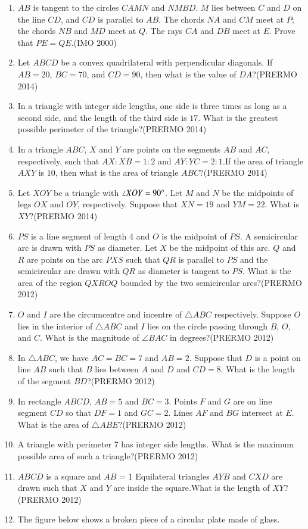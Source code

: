 \begin{enumerate}
\item $AB$ is tangent to the circles $CAMN$ and $NMBD$. $M$ lies between $C$ and $D$ on the line $CD$, and $CD$ is parallel to $AB$. The chords $NA$ and $CM$ meet at $P$; the chords $NB$ and $MD$ meet at $Q$. The rays $CA$ and $DB$ meet at $E$. Prove that $PE = QE$.\hfill(IMO 2000)
    \item Let $ABCD$ be a convex quadrilateral with perpendicular diagonals. If $AB = 20$, $BC = 70$, and $CD = 90$, then what is the value of $DA$?\hfill(PRERMO 2014)
    \item In a triangle with integer side lengths, one side is three times as long as a second side, and the length of the third side is $17$. What is the greatest possible perimeter of the triangle?\hfill(PRERMO 2014)
    \item In a triangle $ABC$, $X$ and $Y$ are points on the segments $AB$ and $AC$, respectively, such that $ AX : XB = 1 : 2 $ and $ AY : YC = 2 : 1.$If the area of triangle $AXY$ is $10$, then what is the area of triangle $ABC$?\hfill(PRERMO 2014)
    \item Let $XOY$ be a triangle with $\angle XOY = 90\degree$. Let $M$ and $N$ be the midpoints of legs $OX$ and $OY$, respectively. Suppose that $XN = 19$ and $YM = 22$. What is $XY$?\hfill(PRERMO 2014)
\item $PS$ is a line segment of length 4 and $O$ is the midpoint of $PS$. A semicircular arc is drawn with $PS$ as diameter. Let $X$ be the midpoint of this arc. $Q$ and $R$ are points on the arc $PXS$ such that $QR$ is parallel to $PS$ and the semicircular arc drawn with $QR$ as diameter is tangent to $PS$. What is the area of the region $QXROQ$ bounded by the two semicircular arcs?\hfill(PRERMO 2012)
\item $O$ and $I$ are the circumcentre and incentre of $\triangle ABC$ respectively. Suppose $O$ lies in the interior of $\triangle ABC$ and $I$ lies on the circle passing through $B$, $O$, and $C$. What is the magnitude of $\angle BAC$ in degrees?\hfill(PRERMO 2012)
\item In $\triangle ABC$, we have $AC = BC = 7$ and $AB = 2$. Suppose that $D$ is a point on line $AB$ such that $B$ lies between $A$ and $D$ and $CD = 8$. What is the length of the segment $BD$?\hfill(PRERMO 2012)
\item In rectangle $ABCD$, $AB = 5$ and $BC = 3$. Points $F$ and $G$ are on line segment $CD$ so that $DF = 1$ and $GC = 2$. Lines $AF$ and $BG$ intersect at $E$. What is the area of $\triangle ABE$?\hfill(PRERMO 2012)
\item A triangle with perimeter 7 has integer side lengths. What is the maximum possible area of such a triangle?\hfill(PRERMO 2012)
\item $ABCD$ is a square and $AB$ = 1 Equilateral triangles $AYB$ and $CXD$ are drawn such that $X$ and $Y$ are inside the square.What is the length of $XY$?\hfill(PRERMO 2012)
\item The figure below shows a broken piece of a circular plate made of glass.
    

\end{enumerate}
